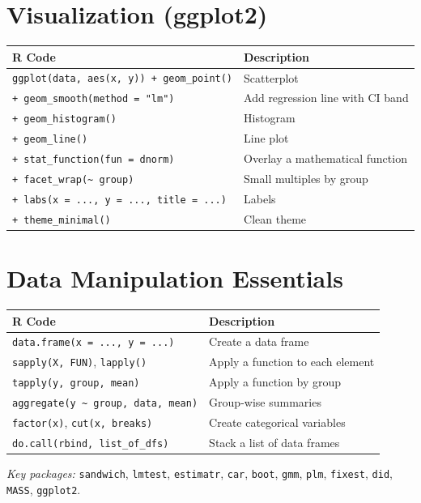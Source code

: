 \documentclass[11pt]{article}
\begin{document}
\section*{Visualization (ggplot2)}

\begin{tabular}{@{}ll@{}}
\toprule
\textbf{R Code} & \textbf{Description} \\
\midrule
\texttt{ggplot(data, aes(x, y)) + geom\_point()} & Scatterplot \\
\texttt{+ geom\_smooth(method = "lm")} & Add regression line with CI band \\
\texttt{+ geom\_histogram()} & Histogram \\
\texttt{+ geom\_line()} & Line plot \\
\texttt{+ stat\_function(fun = dnorm)} & Overlay a mathematical function \\
\texttt{+ facet\_wrap(\~{} group)} & Small multiples by group \\
\texttt{+ labs(x = ..., y = ..., title = ...)} & Labels \\
\texttt{+ theme\_minimal()} & Clean theme \\
\bottomrule
\end{tabular}

\section*{Data Manipulation Essentials}

\begin{tabular}{@{}ll@{}}
\toprule
\textbf{R Code} & \textbf{Description} \\
\midrule
\texttt{data.frame(x = ..., y = ...)} & Create a data frame \\
\texttt{sapply(X, FUN)}, \texttt{lapply()} & Apply a function to each element \\
\texttt{tapply(y, group, mean)} & Apply a function by group \\
\texttt{aggregate(y \~{} group, data, mean)} & Group-wise summaries \\
\texttt{factor(x)}, \texttt{cut(x, breaks)} & Create categorical variables \\
\texttt{do.call(rbind, list\_of\_dfs)} & Stack a list of data frames \\
\bottomrule
\end{tabular}

\bigskip

\noindent\textit{Key packages:} \texttt{sandwich}, \texttt{lmtest}, \texttt{estimatr}, \texttt{car}, \texttt{boot}, \texttt{gmm}, \texttt{plm}, \texttt{fixest}, \texttt{did}, \texttt{MASS}, \texttt{ggplot2}.
\end{document}
